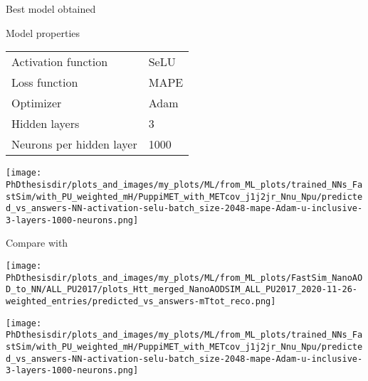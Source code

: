 \begin{frame}{Best model obtained}

\begin{minipage}[c]{.475\textwidth}
\begin{block}{Model properties}
\begin{center}
\begin{tabular}{ll}
Activation function & SeLU\\
Loss function & MAPE\\
Optimizer & Adam\\
Hidden layers & 3\\
Neurons per hidden layer & 1000
\end{tabular}
\end{center}
\end{block}
\end{minipage}
\hfill
\begin{minipage}[c]{.475\textwidth}
\begin{center}\vspace{-4pt}
\texttt{[image: \\PhDthesisdir/plots\_and\_images/my\_plots/ML/from\_ML\_plots/trained\_NNs\_FastSim/with\_PU\_weighted\_mH/PuppiMET\_with\_METcov\_j1j2jr\_Nnu\_Npu/predicted\_vs\_answers-NN-activation-selu-batch\_size-2048-mape-Adam-u-inclusive-3-layers-1000-neurons.png]}
\end{center}\vspace{-5pt}
\end{minipage}

\end{frame}

\addtocounter{framenumber}{-1}
\begin{frame}

\vspace{-5pt}
\manip Compare with \mTtot

\vspace{5pt}

\begin{minipage}[c]{.475\textwidth}
\begin{center}\vspace{-4pt}
\texttt{[image: \\PhDthesisdir/plots\_and\_images/my\_plots/ML/from\_ML\_plots/FastSim\_NanoAOD\_to\_NN/ALL\_PU2017/plots\_Htt\_merged\_NanoAODSIM\_ALL\_PU2017\_2020-11-26-weighted\_entries/predicted\_vs\_answers-mTtot\_reco.png]}
\end{center}\vspace{-5pt}
\end{minipage}
\hfill
\begin{minipage}[c]{.475\textwidth}
\begin{center}\vspace{-4pt}
\texttt{[image: \\PhDthesisdir/plots\_and\_images/my\_plots/ML/from\_ML\_plots/trained\_NNs\_FastSim/with\_PU\_weighted\_mH/PuppiMET\_with\_METcov\_j1j2jr\_Nnu\_Npu/predicted\_vs\_answers-NN-activation-selu-batch\_size-2048-mape-Adam-u-inclusive-3-layers-1000-neurons.png]}
\end{center}\vspace{-5pt}
\end{minipage}

\end{frame}

